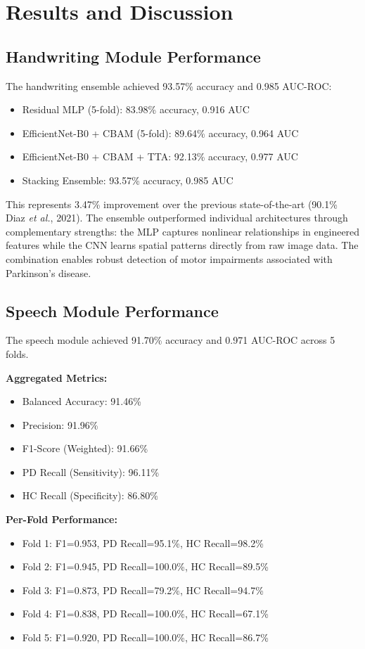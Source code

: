 \documentclass[10pt,conference,letterpaper]{IEEEtran}
\begin{document}
\section{Results and Discussion}

\subsection{Handwriting Module Performance}

The handwriting ensemble achieved 93.57\% accuracy and 0.985 AUC-ROC:
\begin{itemize}
    \item Residual MLP (5-fold): 83.98\% accuracy, 0.916 AUC
    \item EfficientNet-B0 + CBAM (5-fold): 89.64\% accuracy, 0.964 AUC
    \item EfficientNet-B0 + CBAM + TTA: 92.13\% accuracy, 0.977 AUC
    \item Stacking Ensemble: 93.57\% accuracy, 0.985 AUC
\end{itemize}

This represents 3.47\% improvement over the previous state-of-the-art (90.1\% Diaz \textit{et al.}, 2021). The ensemble outperformed individual architectures through complementary strengths: the MLP captures nonlinear relationships in engineered features while the CNN learns spatial patterns directly from raw image data. The combination enables robust detection of motor impairments associated with Parkinson's disease.

\subsection{Speech Module Performance}

The speech module achieved 91.70\% accuracy and 0.971 AUC-ROC across 5 folds.

\textbf{Aggregated Metrics:}
\begin{itemize}
    \item Balanced Accuracy: 91.46\%
    \item Precision: 91.96\%
    \item F1-Score (Weighted): 91.66\%
    \item PD Recall (Sensitivity): 96.11\%
    \item HC Recall (Specificity): 86.80\%
\end{itemize}

\textbf{Per-Fold Performance:}
\begin{itemize}
    \item Fold 1: F1=0.953, PD Recall=95.1\%, HC Recall=98.2\%
    \item Fold 2: F1=0.945, PD Recall=100.0\%, HC Recall=89.5\%
    \item Fold 3: F1=0.873, PD Recall=79.2\%, HC Recall=94.7\%
    \item Fold 4: F1=0.838, PD Recall=100.0\%, HC Recall=67.1\%
    \item Fold 5: F1=0.920, PD Recall=100.0\%, HC Recall=86.7\%
\end{itemize}
\end{document}
